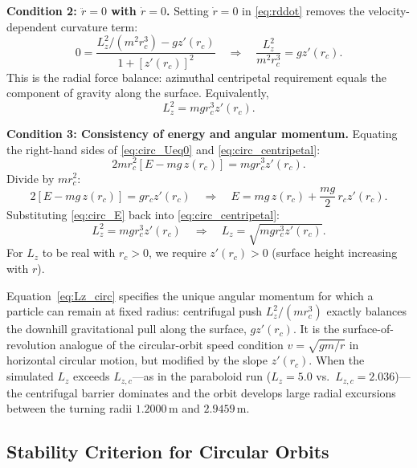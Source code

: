 \documentclass[11pt,letterpaper]{article}
\newcommand{\parhead}[1]{\par\medskip\noindent\textbf{#1}\ignorespaces}
\begin{document}
\parhead{Condition 2: $\ddot{r}=0$ with $\dot{r}=0$.}
Setting $\dot{r}=0$ in \eqref{eq:rddot} removes the velocity-dependent curvature term:
\begin{equation}
    0 = \frac{L_z^2/(m^2 r_c^3) - g z'(r_c)}{1+[z'(r_c)]^2}
    \quad\Longrightarrow\quad
    \frac{L_z^2}{m^2 r_c^3} = g z'(r_c).
\end{equation}
This is the radial force balance: azimuthal centripetal requirement equals the component of gravity along the surface. Equivalently,
\begin{equation}\label{eq:circ_centripetal}
    L_z^2 = m g r_c^3 z'(r_c).
\end{equation}

\parhead{Condition 3: Consistency of energy and angular momentum.}
Equating the right-hand sides of \eqref{eq:circ_Ueq0} and \eqref{eq:circ_centripetal}:
\begin{equation}
    2m r_c^2\left[E - mg\,z(r_c)\right] = m g r_c^3 z'(r_c).
\end{equation}
Divide by $m r_c^2$:
\begin{equation}
    2\left[E - mg\,z(r_c)\right] = g r_c z'(r_c)
    \quad\Longrightarrow\quad
    E = mg\,z(r_c) + \frac{mg}{2}\,r_c z'(r_c).
    \label{eq:circ_E}
\end{equation}
Substituting \eqref{eq:circ_E} back into \eqref{eq:circ_centripetal}:
\begin{equation}
    L_z^2 = m g r_c^3 z'(r_c)
    \quad\Longrightarrow\quad
    L_z = \sqrt{m g r_c^3 z'(r_c)}.
    \label{eq:Lz_circ}
\end{equation}
For $L_z$ to be real with $r_c>0$, we require $z'(r_c)>0$ (surface height increasing with $r$).

\begin{summarybox}
Equation~\eqref{eq:Lz_circ} specifies the unique angular momentum for which a particle can remain at fixed radius: centrifugal push $L_z^2/(mr_c^3)$ exactly balances the downhill gravitational pull along the surface, $gz'(r_c)$. It is the surface-of-revolution analogue of the circular-orbit speed condition $v=\sqrt{gm/r}$ in horizontal circular motion, but modified by the slope $z'(r_c)$. When the simulated $L_z$ exceeds $L_{z,c}$---as in the paraboloid run ($L_z=5.0$ vs.\ $L_{z,c}=2.036$)---the centrifugal barrier dominates and the orbit develops large radial excursions between the turning radii $1.2000\,\mathrm{m}$ and $2.9459\,\mathrm{m}$.
\end{summarybox}

\subsection{Stability Criterion for Circular Orbits}
\label{sec:stability}
\end{document}
